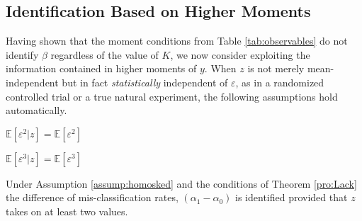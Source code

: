 \subsection{Identification Based on Higher Moments}
Having shown that the moment conditions from Table \ref{tab:observables} do not identify $\beta$ regardless of the value of $K$, we now consider exploiting the information contained in higher moments of $y$. 
When $z$ is not merely mean-independent but in fact \emph{statistically} independent of $\varepsilon$, as in a randomized controlled trial or a true natural experiment, the following assumptions hold automatically.
\begin{assump}
  $\mathbb{E}[\varepsilon^2|z]=\mathbb{E}[\varepsilon^2]$
  \label{assump:homosked}
\end{assump}
\begin{assump}
  $\mathbb{E}[\varepsilon^3|z]=\mathbb{E}[\varepsilon^3]$
  \label{assump:skew}
\end{assump}
\begin{thm}
  \label{pro:homosked}
  Under Assumption \ref{assump:homosked} and the conditions of Theorem \ref{pro:Lack} the difference of mis-classification rates, $(\alpha_1 - \alpha_0)$ is identified provided that $z$ takes on at least two values.
\end{thm}

